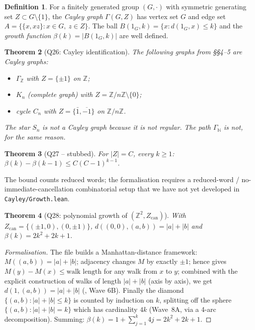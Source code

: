 \documentclass[11pt,a4paper]{article}
\newcommand{\lmod}[1]{\texttt{\small #1}}
\newcommand{\N}{\mathbb{N}}
\newcommand{\Z}{\mathbb{Z}}
\theoremstyle{plain}
\newtheorem{theorem}{Theorem}[section]
\theoremstyle{definition}
\newtheorem{definition}[theorem]{Definition}
\begin{document}
\begin{definition}
For a finitely generated group $(G, \cdot)$ with symmetric
generating set $Z \subset G \setminus \{1\}$, the \emph{Cayley graph}
$\Gamma(G, Z)$ has vertex set $G$ and edge set
$A = \{\{x, xz\} : x \in G,\ z \in Z\}$. The ball
$B(1_G, k) = \{x : d(1_G, x) \leq k\}$ and the \emph{growth function}
$\beta(k) = |B(1_G, k)|$ are well defined.
\end{definition}

\begin{theorem}[Q26: Cayley identification]
The following graphs from \S\S4--5 are Cayley graphs:
\begin{itemize}[leftmargin=2em]
\item $\Gamma_\Z$ with $Z = \{\pm 1\}$ on $\Z$;
\item $K_n$ (complete graph) with $Z = \Z/n\Z \setminus \{0\}$;
\item cycle $C_n$ with $Z = \{\bar 1, \overline{-1}\}$ on $\Z/n\Z$.
\end{itemize}
The star $S_n$ is \emph{not} a Cayley graph because it is not regular.
The path $\Gamma_\N$ is not, for the same reason.
\end{theorem}

\begin{theorem}[Q27 -- stubbed]
For $|Z| = C$, every $k \geq 1$: $\beta(k) - \beta(k-1) \leq C(C-1)^{k-1}$.
\end{theorem}

The bound counts reduced words; the formalisation requires a
reduced-word / no-immediate-cancellation combinatorial setup that we
have not yet developed in \lmod{Cayley/Growth.lean}.

\begin{theorem}[Q28: polynomial growth of $(\Z^2, Z_{\mathrm{can}})$]
With $Z_{\mathrm{can}} = \{(\pm 1, 0), (0, \pm 1)\}$,
$d((0,0), (a,b)) = |a| + |b|$ and
$\beta(k) = 2k^2 + 2k + 1$.
\end{theorem}

\begin{proof}[Formalisation]
The file builds a Manhattan-distance framework:
$M((a,b)) = |a| + |b|$; adjacency changes $M$ by exactly $\pm 1$;
hence  gives $M(y) - M(x) \leq \text{walk length}$
for any walk from $x$ to $y$; combined with the explicit
construction of walks of length $|a| + |b|$ (axis by axis), we get
$d(1, (a,b)) = |a| + |b|$ (, Wave 6B).
Finally the diamond
$\{(a,b) : |a|+|b| \leq k\}$ is counted by induction on $k$, splitting
off the sphere
$\{(a,b) : |a|+|b| = k\}$ which has cardinality $4k$ (Wave~8A,
via a 4-arc decomposition). Summing:
$\beta(k) = 1 + \sum_{j=1}^k 4j = 2k^2 + 2k + 1$.
\end{proof}
\end{document}

